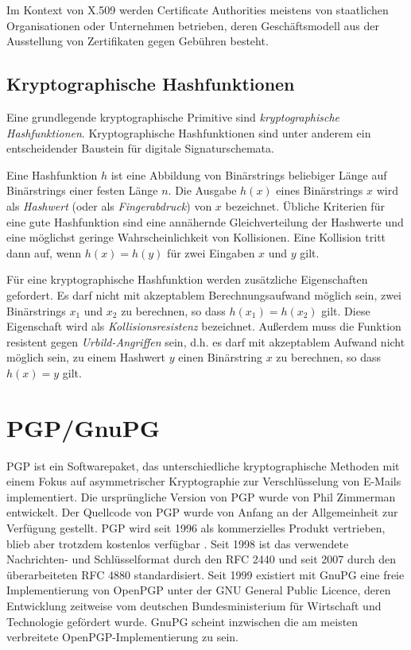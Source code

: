 Im Kontext von X.509 werden Certificate Authorities meistens von
staatlichen Organisationen oder Unternehmen betrieben, deren
Geschäftsmodell aus der Ausstellung von Zertifikaten gegen
Gebühren besteht. 

\subsection{Kryptographische Hashfunktionen}
\label{sec:krypt-hashf}

Eine grundlegende kryptographische Primitive sind
\emph{kryptographische Hashfunktionen}. Kryptographische
Hashfunktionen sind unter anderem ein entscheidender Baustein für
digitale Signaturschemata.

Eine Hashfunktion $h$ ist eine Abbildung von Binärstrings beliebiger
Länge auf Binärstrings einer festen Länge $n$. Die Ausgabe
$h(x)$ eines Binärstrings $x$ wird als \emph{Hashwert} (oder als
\emph{Fingerabdruck}) von $x$ bezeichnet. Übliche Kriterien für
eine gute Hashfunktion sind eine annähernde Gleichverteilung der
Hashwerte und eine möglichst geringe Wahrscheinlichkeit von
Kollisionen. Eine Kollision tritt dann auf, wenn $h(x) = h(y)$ für
zwei Eingaben $x$ und $y$ gilt.

Für eine kryptographische Hashfunktion werden zusätzliche
Eigenschaften gefordert. Es darf nicht mit akzeptablem
Berechnungsaufwand möglich sein, zwei Binärstrings $x_1$ und $x_2$
zu berechnen, so dass $h(x_1) = h(x_2)$ gilt. Diese Eigenschaft wird
als \emph{Kollisionsresistenz} bezeichnet. Außerdem muss die Funktion
resistent gegen \emph{Urbild-Angriffen} sein, d.h. es darf mit
akzeptablem Aufwand nicht möglich sein, zu einem Hashwert $y$ einen
Binärstring $x$ zu berechnen, so dass $h(x) = y$ gilt.


\section{PGP/GnuPG}
\label{ch:Grundlagen:sec:PGP}

PGP ist ein Softwarepaket, das unterschiedliche kryptographische
Methoden mit einem Fokus auf asymmetrischer Kryptographie zur
Verschlüsselung von E-Mails implementiert.  Die ursprüngliche
Version von PGP wurde von Phil Zimmerman entwickelt. Der Quellcode von
PGP wurde von Anfang an der Allgemeinheit zur Verfügung
gestellt. PGP wird seit 1996 als kommerzielles Produkt vertrieben,
blieb aber trotzdem kostenlos verfügbar \cite{wiki:pgp}. Seit 1998
ist das verwendete Nachrichten- und Schlüsselformat durch den RFC
2440 \cite{Callas1998} und seit 2007 durch den überarbeiteten RFC
4880 \cite{Callas2007} standardisiert. Seit 1999 existiert mit
GnuPG \cite{Gnupg2010} eine freie Implementierung von OpenPGP unter der
GNU General Public Licence, deren Entwicklung zeitweise vom deutschen
Bundesministerium für Wirtschaft und Technologie gefördert
wurde. GnuPG scheint inzwischen die am meisten verbreitete
OpenPGP-Implementierung zu sein.

